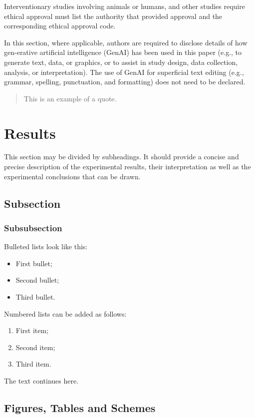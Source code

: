 \documentclass[journal,article,submit,pdftex,moreauthors]{Definitions/mdpi}
\begin{document}
Interventionary studies involving animals or humans, and other studies require ethical approval must list the authority that provided approval and the corresponding ethical approval code.

In this section, where applicable, authors are required to disclose details of how gen-erative artificial intelligence (GenAI) has been used in this paper (e.g., to generate text, data, or graphics, or to assist in study design, data collection, analysis, or interpretation). The use of GenAI for superficial text editing (e.g., grammar, spelling, punctuation, and formatting) does not need to be declared.

\begin{quote}
This is an example of a quote.
\end{quote}

\section{Results}

This section may be divided by subheadings. It should provide a concise and precise description of the experimental results, their interpretation as well as the experimental conclusions that can be drawn.
\subsection{Subsection}
\subsubsection{Subsubsection}

Bulleted lists look like this:
\begin{itemize}
\item	First bullet;
\item	Second bullet;
\item	Third bullet.
\end{itemize}

Numbered lists can be added as follows:
\begin{enumerate}
\item	First item; 
\item	Second item;
\item	Third item.
\end{enumerate}

The text continues here.

\subsection{Figures, Tables and Schemes}
\end{document}
